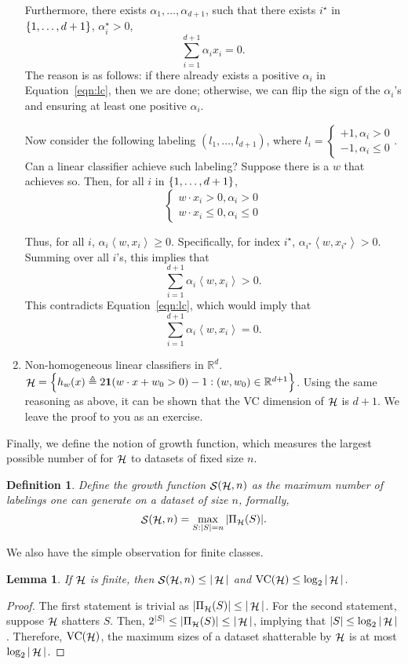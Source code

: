 \documentclass{article}
\newtheorem{lemma}{Lemma}
\newtheorem{definition}{Definition}
\DeclareMathOperator*{\Hcal}{{\cal H}}
\DeclareMathOperator*{\Scal}{{\cal S}}
\DeclareMathOperator*{\VC}{{\rm VC}}
\newcommand{\RR}{\mathbb{R}} %
\newcommand{\defeq}{\triangleq}
\newcommand*{\one}{{\bf 1}}
\newcommand{\inner}[2]{\left\langle #1,#2 \right\rangle}
\begin{document}
\begin{enumerate}
Furthermore, there exists $\alpha_1, \ldots, \alpha_{d+1}$, such that there exists $i^\star$ in $\cbr{1,\ldots,d+1}$, $\alpha_i^\star > 0$,
\[ \sum_{i=1}^{d+1} \alpha_i x_i = 0. \]
The reason is as follows: if there already exists a positive $\alpha_i$ in Equation~\ref{eqn:lc}, then we are done; otherwise, we can flip the sign of the $\alpha_i$'s and ensuring at least one positive $\alpha_i$.

Now consider the following labeling $(l_1, \ldots, l_{d+1})$, where $l_i = \begin{cases} +1, \alpha_i > 0 \\ -1, \alpha_i \leq 0 \end{cases}$. Can a linear classifier achieve such labeling? Suppose there is a $w$ that achieves so. Then, for all $i$ in $\cbr{1,\ldots,d+1}$,
\[
\begin{cases} w \cdot x_i > 0, \alpha_i > 0 \\ w \cdot x_i \leq 0, \alpha_i \leq 0 \end{cases}
\]

Thus, for all $i$, $\alpha_i \inner{w}{x_i} \geq 0$. Specifically, for index $i^\star$, $\alpha_{i^\star} \inner{w}{x_{i^\star}} > 0$.
Summing over all $i$'s, this implies that
\[
  \sum_{i=1}^{d+1} \alpha_i \inner{w}{x_i} > 0.
\]
This contradicts Equation~\ref{eqn:lc}, which would imply that
\[
  \sum_{i=1}^{d+1} \alpha_i \inner{w}{x_i}= 0.
\]

\item Non-homogeneous linear classifiers in $\RR^d$.
$\Hcal = \cbr{h_w(x) \defeq 2\one(w \cdot x + w_0 > 0) - 1: (w, w_0) \in \RR^{d+1}}$.
Using the same reasoning as above, it can be shown that the VC dimension of $\Hcal$ is
$d+1$. We leave the proof to you as an exercise.
\end{enumerate}

Finally, we define the notion of growth function, which measures the largest possible number of for $\Hcal$ to datasets of fixed size $n$.
\begin{definition}
Define the growth function $\Scal(\Hcal, n)$ as the maximum number of labelings one can generate on a dataset of size $n$, formally,
\[ \Scal(\Hcal, n) = \max_{S: |S| = n} |\Pi_{\Hcal}(S)|. \]
\end{definition}

We also have the simple observation for finite classes.
\begin{lemma}
If $\Hcal$ is finite, then $\Scal(\Hcal, n) \leq |\Hcal|$ and $\VC(\Hcal) \leq \log_2 |\Hcal|$.
\end{lemma}
\begin{proof}
The first statement is trivial as $|\Pi_{\Hcal}(S)| \leq |\Hcal|$. For the second statement, suppose $\Hcal$ shatters $S$.
Then, $2^{|S|} \leq |\Pi_{\Hcal}(S)| \leq |\Hcal|$, implying that $|S| \leq \log_2 |\Hcal|$.
Therefore, $\VC(\Hcal)$, the maximum sizes of a dataset shatterable by $\Hcal$ is at most $\log_2 |\Hcal|$.
\end{proof}
\end{document}
